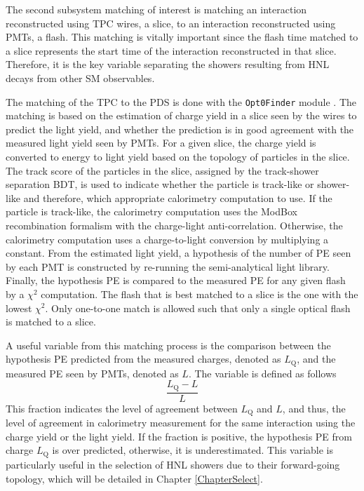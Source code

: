 The second subsystem matching of interest is matching an interaction reconstructed using TPC wires, 
a slice, to an interaction reconstructed using PMTs, a flash.                                        
This matching is vitally important since the flash time matched to a slice represents the start time of the interaction reconstructed in that slice.
Therefore, it is the key variable separating the showers resulting from HNL decays from other SM observables.

The matching of the TPC to the PDS is done with the \texttt{Opt0Finder} module \cite{opt0finder_module}.
The matching is based on the estimation of charge yield in a slice seen by the wires to predict the light yield, and whether the prediction is in good agreement with the measured light yield seen by PMTs.
For a given slice, the charge yield is converted to energy to light yield based on the topology of particles in the slice.
The track score of the particles in the slice, assigned by the track-shower separation BDT, is used to indicate whether the particle is track-like or shower-like and therefore, which appropriate calorimetry computation to use.
If the particle is track-like, the calorimetry computation uses the ModBox recombination formalism with 
the charge-light anti-correlation. 
Otherwise, the calorimetry computation uses a charge-to-light conversion by multiplying a constant.     
From the estimated light yield, a hypothesis of the number of PE seen by each PMT is constructed by re-running the semi-analytical light library.
Finally, the hypothesis PE is compared to the measured PE for any given flash by a $\chi^2$ computation.
The flash that is best matched to a slice is the one with the lowest $\chi^2$.
Only one-to-one match is allowed such that only a single optical flash is matched to a slice.

A useful variable from this matching process is the comparison between the hypothesis PE predicted from the measured charges, denoted as $L_{\mathrm{Q}}$, and the measured PE seen by PMTs, denoted as $L$.
The variable is defined as follows
\begin{equation}
\label{eq:opt0fraction}
	\frac{L_{\mathrm{Q}} - L}{L}
\end{equation}
This fraction indicates the level of agreement between $L_{\mathrm{Q}}$ and $L$, and thus, the level of agreement in calorimetry measurement for the same interaction using the charge yield or the light yield. 
If the fraction is positive, the hypothesis PE from charge $L_{\mathrm{Q}}$ is over predicted, otherwise, it is underestimated.
This variable is particularly useful in the selection of HNL showers due to their forward-going topology, which will be detailed in Chapter \ref{ChapterSelect}.

